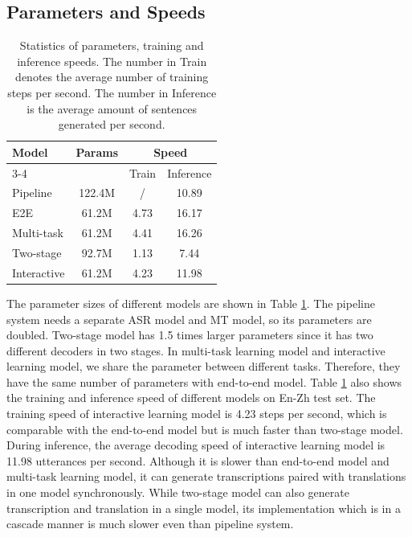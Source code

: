 \documentclass[letterpaper]{article} %
\begin{document}
\subsection{Parameters and Speeds}
\begin{table}[t]
	\centering
	\begin{tabular}{l|c|c|c}
		\hline
		\multirow{2}{*}{Model} & \multirow{2}{*}{Params} & \multicolumn{2}{c}{Speed} \\ 
		\cline{3-4} 
		~                          &            ~            & Train       & Inference        \\ 
		\hline
		Pipeline               & 122.4M              & /               & 10.89       \\
		E2E           & 61.2M                & 4.73         & 16.17       \\
		Multi-task            & 61.2M                & 4.41         & 16.26       \\
		Two-stage          & 92.7M                & 1.13         & 7.44        \\
		Interactive           & 61.2M                & 4.23        & 11.98       \\ \hline
	\end{tabular}
	\caption{Statistics of parameters, training and inference speeds. The number in Train denotes the average number of training steps per second. The number in Inference is the average amount of sentences generated per second.}
	\label{tbl:parameter}
\end{table}
The parameter sizes of different models are shown in Table \ref{tbl:parameter}. The pipeline system needs a separate ASR model and MT model, so its parameters are doubled. 
Two-stage model has 1.5 times larger parameters since it has two different decoders in two stages. 
In multi-task learning model and interactive learning model, we share the parameter between different tasks. Therefore, they have the same number of parameters with end-to-end model. 
Table \ref{tbl:parameter} also shows the training and inference speed of different models on En-Zh  test set. The training speed of interactive learning model is 4.23 steps per second, which is comparable with the end-to-end model but is much faster than two-stage model. During inference, the average decoding speed of interactive learning model is 11.98 utterances per second. Although it is slower than end-to-end model and multi-task learning model, it can generate transcriptions paired with translations in one model synchronously. While two-stage model can also generate transcription and translation in a single model, its implementation which is in a cascade manner is much slower even than pipeline system.
\end{document}
